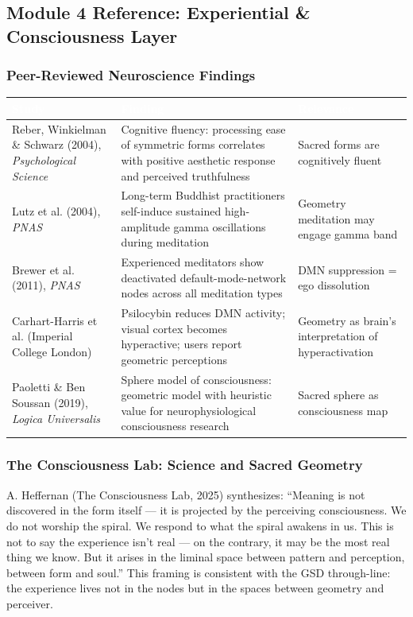 \documentclass[11pt,letterpaper]{article}
\newcommand{\tableheader}[1]{\textbf{\sffamily\textcolor{white}{#1}}}
\begin{document}
\subsection{Module 4 Reference: Experiential \& Consciousness Layer}

\subsubsection{Peer-Reviewed Neuroscience Findings}

\begin{center}
\begin{tabularx}{\textwidth}{L{4cm}XL{2.5cm}}
\toprule
{}
\tableheader{Study} & \tableheader{Finding} & \tableheader{Relevance} \\
\midrule
Reber, Winkielman \& Schwarz (2004), \textit{Psychological Science} & Cognitive fluency: processing ease of symmetric forms correlates with positive aesthetic response and perceived truthfulness & Sacred forms are cognitively fluent \\
Lutz et al. (2004), \textit{PNAS} & Long-term Buddhist practitioners self-induce sustained high-amplitude gamma oscillations during meditation & Geometry meditation may engage gamma band \\
Brewer et al. (2011), \textit{PNAS} & Experienced meditators show deactivated default-mode-network nodes across all meditation types & DMN suppression = ego dissolution \\
Carhart-Harris et al. (Imperial College London) & Psilocybin reduces DMN activity; visual cortex becomes hyperactive; users report geometric perceptions & Geometry as brain's interpretation of hyperactivation \\
Paoletti \& Ben Soussan (2019), \textit{Logica Universalis} & Sphere model of consciousness: geometric model with heuristic value for neurophysiological consciousness research & Sacred sphere as consciousness map \\
\bottomrule
\end{tabularx}
\end{center}

\subsubsection{The Consciousness Lab: Science and Sacred Geometry}

A. Heffernan (The Consciousness Lab, 2025) synthesizes: ``Meaning is not discovered in the form itself --- it is projected by the perceiving consciousness. We do not worship the spiral. We respond to what the spiral awakens in us. This is not to say the experience isn't real --- on the contrary, it may be the most real thing we know. But it arises in the liminal space between pattern and perception, between form and soul.'' This framing is consistent with the GSD through-line: the experience lives not in the nodes but in the spaces between geometry and perceiver.
\end{document}
